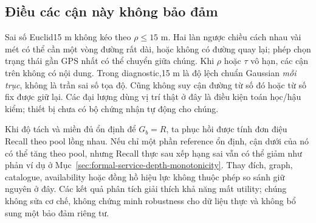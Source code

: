 \subsection{Điều các cận này không bảo đảm}
\label{sec:formal-ranking-robustness-limits}

Sai số Euclid15 m không kéo theo $\rho\leq15$ m. Hai làn ngược chiều
cách nhau vài mét có thể cần một vòng đường rất dài, hoặc không có
đường quay lại; phép chọn trạng thái gần GPS nhất có thể chuyển giữa
chúng. Khi $\rho$ hoặc $\tau$ vô hạn, các cận trên không có nội dung.
Trong diagnostic,15 m là độ lệch chuẩn Gaussian \emph{mỗi trục}, không
là trần sai số tọa độ. Cũng không suy cận đường từ số đó hoặc từ số
fix được giữ lại. Các đại lượng dùng vị trí thật ở đây là điều kiện toán
học/hậu kiểm; thiết bị chưa có bộ chứng nhận tự động cho chúng.

Khi độ tách và miền đủ ổn định để $G_b=R$, ta phục hồi được tính
đơn điệu Recall theo pool lồng nhau. Nếu chỉ một phần reference ổn
định, cận dưới của nó có thể tăng theo pool, nhưng Recall thực sau
xếp hạng sai vẫn có thể giảm như phản ví dụ ở
Mục~\ref{sec:formal-service-depth-monotonicity}. Thay đích, graph,
catalogue, availability hoặc đồng hồ hiệu lực không thuộc phép so sánh
giữ nguyên ở đây. Các kết quả phân tích giải thích khả năng mất utility;
chúng không sửa cơ chế, không chứng minh robustness cho dữ liệu thực
và không bổ sung một bảo đảm riêng tư.
